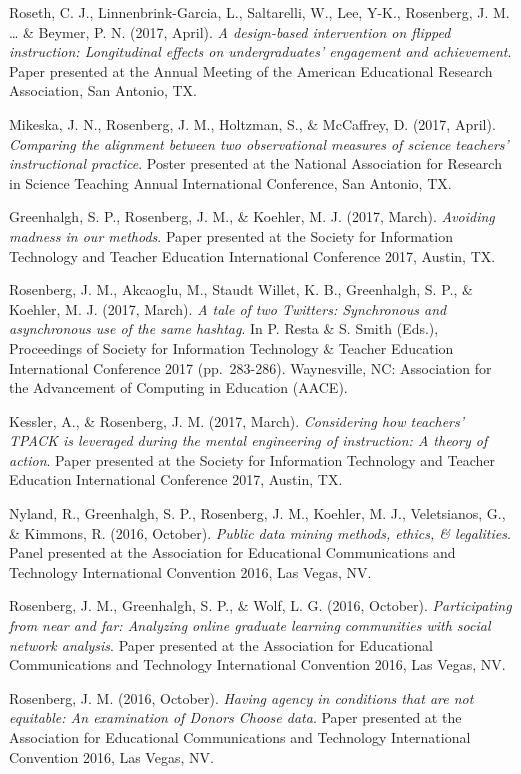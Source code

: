 \documentclass[14,]{article}
\begin{document}
Roseth, C. J., Linnenbrink-Garcia, L., Saltarelli, W., Lee, Y-K.,
Rosenberg, J. M. \ldots{} \& Beymer, P. N. (2017, April). \emph{A
design-based intervention on flipped instruction: Longitudinal effects
on undergraduates' engagement and achievement}. Paper presented at the
Annual Meeting of the American Educational Research Association, San
Antonio, TX.

Mikeska, J. N., Rosenberg, J. M., Holtzman, S., \& McCaffrey, D. (2017,
April). \emph{Comparing the alignment between two observational measures
of science teachers' instructional practice}. Poster presented at the
National Association for Research in Science Teaching Annual
International Conference, San Antonio, TX.

Greenhalgh, S. P., Rosenberg, J. M., \& Koehler, M. J. (2017, March).
\emph{Avoiding madness in our methods}. Paper presented at the Society
for Information Technology and Teacher Education International
Conference 2017, Austin, TX.

Rosenberg, J. M., Akcaoglu, M., Staudt Willet, K. B., Greenhalgh, S. P.,
\& Koehler, M. J. (2017, March). \emph{A tale of two Twitters:
Synchronous and asynchronous use of the same hashtag}. In P. Resta \& S.
Smith (Eds.), Proceedings of Society for Information Technology \&
Teacher Education International Conference 2017 (pp.~283-286).
Waynesville, NC: Association for the Advancement of Computing in
Education (AACE).

Kessler, A., \& Rosenberg, J. M. (2017, March). \emph{Considering how
teachers' TPACK is leveraged during the mental engineering of
instruction: A theory of action}. Paper presented at the Society for
Information Technology and Teacher Education International Conference
2017, Austin, TX.

Nyland, R., Greenhalgh, S. P., Rosenberg, J. M., Koehler, M. J.,
Veletsianos, G., \& Kimmons, R. (2016, October). \emph{Public data
mining methods, ethics, \& legalities}. Panel presented at the
Association for Educational Communications and Technology International
Convention 2016, Las Vegas, NV.

Rosenberg, J. M., Greenhalgh, S. P., \& Wolf, L. G. (2016, October).
\emph{Participating from near and far: Analyzing online graduate
learning communities with social network analysis}. Paper presented at
the Association for Educational Communications and Technology
International Convention 2016, Las Vegas, NV.

Rosenberg, J. M. (2016, October). \emph{Having agency in conditions that
are not equitable: An examination of Donors Choose data}. Paper
presented at the Association for Educational Communications and
Technology International Convention 2016, Las Vegas, NV.
\end{document}
